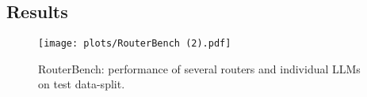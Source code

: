 \subsection{Results} %

\begin{figure}
    \centering
        \texttt{[image: plots/RouterBench (2).pdf]} 
    \vspace{-0.3cm}
\caption{RouterBench: performance of several routers and individual LLMs on test data-split.}
\label{fig:RouterBench-main}
\end{figure}

